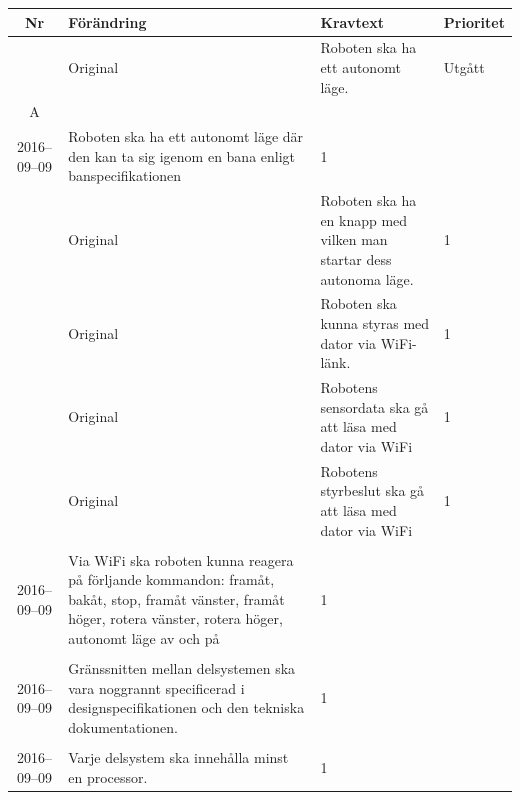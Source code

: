 \documentclass[a4paper,titlepage,12pt]{article}
\newcounter{reqNr}
\newcommand{\nextReqNr}{\stepcounter{reqNr}\arabic{reqNr}}
\newcounter{reqNrII}
\newcommand{\nextReqNrII}{\stepcounter{reqNrII}\arabic{reqNrII}}
\newcommand{\newContent}[1] {\pbox{5cm}{Nytt innehåll i \arabic{reqNr}\\#1}}
\newcommand{\newRequirement}[1] {\pbox{5cm}{Nytt krav \\#1}}
\begin{document}
	\begin{table}[h]
		\begin{tabularx}{\textwidth}{ c l X l }
			\textbf{Nr} & \textbf{Förändring} & \textbf{Kravtext} & \textbf{Prioritet} 
				\\ \midrule
			\nextReqNr{} & Original & Roboten ska ha ett autonomt läge. & Utgått
					\\ \midrule
	
			\arabic{reqNr}A & \newContent{2016--09--09} & Roboten ska ha ett autonomt läge där den kan ta
                              sig igenom en bana enligt banspecifikationen & 1
					\\ \midrule

			\nextReqNr{} & Original & Roboten ska ha en knapp med vilken man startar 
				dess autonoma läge. & 1
				\\ \midrule

			\nextReqNr{} & Original & Roboten ska kunna styras med dator 
				via WiFi-länk. & 1
				\\ \midrule
		
			\nextReqNr{} & Original & Robotens sensordata ska gå att läsa 
				med dator via WiFi & 1
				\\ \midrule

			\nextReqNr{} & Original & Robotens styrbeslut ska gå att läsa 
				med dator via WiFi & 1
                \\ \midrule
      
			\nextReqNr{} & \newRequirement{2016--09--09} & Via WiFi ska roboten kunna reagera på förljande
                              kommandon: framåt, bakåt, stop, framåt vänster,
                              framåt höger, rotera vänster, rotera höger,
                              autonomt läge av och på & 1
                \\ \midrule

            \nextReqNrII{} & \newRequirement{2016--09--09} & Gränssnitten
            mellan delsystemen ska vara noggrannt specificerad i
            designspecifikationen och den tekniska dokumentationen. & 1
                \\ \midrule

            \nextReqNrII{} & \newRequirement{2016--09--09} & Varje delsystem
            ska innehålla minst en processor. & 1
				\\ \bottomrule
		\end{tabularx}
	\end{table}
\end{document}
